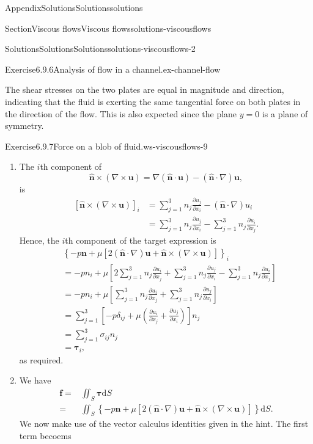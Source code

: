 \documentclass[oneside,10pt,]{book}
\numberwithin{equation}{section}
\newcommand{\de}{\mathrm{d}}
\newcommand{\pd}[2]{\frac{\partial#1}{\partial#2}}
\newcommand{\bn}{\boldsymbol{n}}
\newcommand{\bu}{\boldsymbol{u}}
\renewcommand{\bf}{\boldsymbol{f}}
\newcommand{\btau}{\boldsymbol{\tau}}
\begin{document}
\begin{appendixptx}{Appendix}{Solutions}{}{Solutions}{}{}{solutions}
\begin{sectionptx}{Section}{Viscous flows}{}{Viscous flows}{}{}{solutions-viscousflows}
\begin{solutions-subsection-numberless}{Solutions}{Solutions}{}{Solutions}{}{}{solutions-viscousflows-2}
\begin{divisionsolution}{Exercise}{6.9.6}{Analysis of flow in a channel.}{ex-channel-flow}
\begin{enumerate}[font=\bfseries,label=(\alph*),ref=\alph*]
\par
The shear stresses on the two plates are equal in magnitude and direction, indicating that the fluid is exerting the same tangential force on both plates in the direction of the flow. This is also expected since the plane \(y=0\) is a plane of symmetry.%
\end{enumerate}%
\end{divisionsolution}%
\begin{divisionsolution}{Exercise}{6.9.7}{Force on a blob of fluid.}{ws-viscousflows-9}%
\begin{enumerate}[font=\bfseries,label=(\alph*),ref=\alph*]%
\item[(a)]\noindent\hypertarget{ws-viscousflows-9-3-3-main}{}The \(i\)th component of%
\begin{equation*}
\hat{\bn}\times\left(\nabla\times\bu\right)
=\nabla(\hat{\bn}\cdot\bu)-(\hat{\bn}\cdot\nabla)\bu,
\end{equation*}
is%
\begin{align*}
\left[\hat{\bn}\times(\nabla\times\bu)\right]_i
&=\sum_{j=1}^3n_j\pd{u_j}{x_i}-(\hat{\bn}\cdot\nabla)u_i\\
&=\sum_{j=1}^3n_j\pd{u_j}{x_i}-\sum_{j=1}^3n_j\pd{u_i}{x_j}.
\end{align*}
Hence, the \(i\)th component of the target expression is%
\begin{align*}
&\left\{-p\bn+\mu\left[2(\hat{\bn}\cdot\nabla)\bu
+\hat{\bn}\times(\nabla\times\bu)\right]\right\}_i\\
&=-pn_i+\mu\left[2\sum_{j=1}^3n_j\pd{u_i}{x_j}
+\sum_{j=1}^3n_j\pd{u_j}{x_i}-\sum_{j=1}^3n_j\pd{u_i}{x_j}\right]\\
&=-pn_i+\mu\left[\sum_{j=1}^3n_j\pd{u_i}{x_j}
+\sum_{j=1}^3n_j\pd{u_j}{x_i}\right]\\
&=\sum_{j=1}^3\left[-p\delta_{ij}+\mu\left(\pd{u_i}{x_j}
+\pd{u_j}{x_i}\right)\right]n_j\\
&=\sum_{j=1}^3\sigma_{ij}n_j\\
&=\btau_i,
\end{align*}
as required.%
\item[(b)]\noindent\hypertarget{ws-viscousflows-9-4-3-main}{}We have%
\begin{align*}
\bf=&\iint_S\btau\de S\\
=&\iint_S\left\{-p\hat{\bn}+\mu\left[2(\hat{\bn}\cdot\nabla)\bu
+\hat{\bn}\times(\nabla\times\bu)\right]\right\}\de S.
\end{align*}
We now make use of the vector calculus identities given in the hint. The first term becoems%

\end{enumerate}
\end{divisionsolution}
\end{solutions-subsection-numberless}
\end{sectionptx}
\end{appendixptx}
\end{document}
